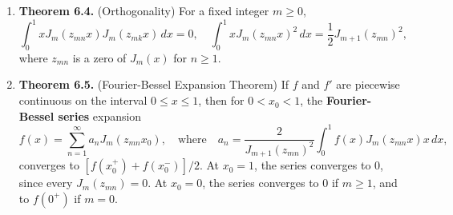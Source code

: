 \begin{enumerate}
    



    \item \textbf{Theorem 6.4.} (Orthogonality) For a fixed integer $m \geq 0$,
    \[\int_{0}^{1} x J_{m}(z_{mn}x)J_{m}(z_{mk}x)\,dx=0, \quad \int_{0}^{1} xJ_{m}(z_{mn}x)^{2}\,dx = \frac{1}{2}J_{m+1}(z_{mn})^{2},\]
    where $z_{mn}$ is a zero of $J_{m}(x)$ for $n\geq 1$.

    \item \textbf{Theorem 6.5.} (Fourier-Bessel Expansion Theorem) If $f$ and $f'$ are piecewise continuous on the interval $0 \leq x \leq 1$, then for $0 < x _{0} < 1$, the \textbf{Fourier-Bessel series} expansion
    \[f(x) = \sum_{n=1}^{\infty} a_{n}J_{m}(z_{mn}x_{0}), \quad \text{where}\quad a_{n} = \frac{2}{J_{m+1}(z_{mn})^{2}} \int _{0}^{1} f(x) J_{m}(z_{mn}x)x\,dx,\]
    converges to $[f(x_{0}^{+})+f({x_{0}^{-}})]/2$. At $x _{0} = 1$, the series converges to $0$, since every $J _{m} (z _{mn} ) = 0$. At $x _{0} = 0$, the series converges to 0 if $m \geq 1$, and to $f (0 ^{+} )$ if $m = 0$.

\end{enumerate}

